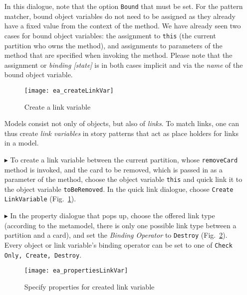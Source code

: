 \begin{itemize}
In this dialogue, note that the option \texttt{Bound} that must be set. For the pattern matcher, bound object variables do not need
to be assigned as they already have a fixed value from the context of the method.   We have already seen two cases  for bound object variables: the assignment
to \texttt{this} (the current partition who owns the method), and assignments to parameters of the  method that  are specified when invoking
the method.   Please note that the assignment or \emph{binding [state]} is in both cases implicit and via the \emph{name} of the bound object variable.

\begin{figure}[htp]
\begin{center}
  \texttt{[image: ea\_createLinkVar]}
  \caption{Create a link variable}   
  \label{fig:link_variable}
\end{center}
\end{figure}

Models consist not only of objects, but also of \emph{links}. To match links, one can thus create \emph{link variables}  in story patterns
that act as place holders for links in a model.

\item[$\blacktriangleright$] To create a link variable between the current partition, whose \texttt{removeCard} method is invoked, and the
card to be removed, which is passed in as a parameter of the method, choose the object variable \texttt{this} and quick link it to the object variable
\texttt{toBeRemoved}. In the quick link dialogue, choose \texttt{Create LinkVariable} (Fig.~\ref{fig:link_variable}).

\item[$\blacktriangleright$] In the property dialogue that pops up, choose the offered link type (according to the metamodel, there is only one possible link type between a partition and a
 card), and set the \emph{Binding Operator} to \texttt{Destroy} (Fig.~\ref{fig:link_variable_properties}). Every object or link
variable's binding operator can be set to one of \texttt{Check Only, Create, Destroy}.

\begin{figure}[htp]
\begin{center} 
 \texttt{[image: ea\_propertiesLinkVar]}
  \caption{Specify properties for created link variable}  
  \label{fig:link_variable_properties}
\end{center}
\end{figure}


\end{itemize}
